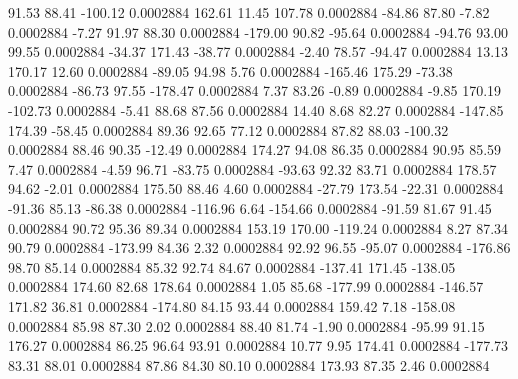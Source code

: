        91.53       88.41     -100.12     0.0002884
      162.61       11.45      107.78     0.0002884
      -84.86       87.80       -7.82     0.0002884
       -7.27       91.97       88.30     0.0002884
     -179.00       90.82      -95.64     0.0002884
      -94.76       93.00       99.55     0.0002884
      -34.37      171.43      -38.77     0.0002884
       -2.40       78.57      -94.47     0.0002884
       13.13      170.17       12.60     0.0002884
      -89.05       94.98        5.76     0.0002884
     -165.46      175.29      -73.38     0.0002884
      -86.73       97.55     -178.47     0.0002884
        7.37       83.26       -0.89     0.0002884
       -9.85      170.19     -102.73     0.0002884
       -5.41       88.68       87.56     0.0002884
       14.40        8.68       82.27     0.0002884
     -147.85      174.39      -58.45     0.0002884
       89.36       92.65       77.12     0.0002884
       87.82       88.03     -100.32     0.0002884
       88.46       90.35      -12.49     0.0002884
      174.27       94.08       86.35     0.0002884
       90.95       85.59        7.47     0.0002884
       -4.59       96.71      -83.75     0.0002884
      -93.63       92.32       83.71     0.0002884
      178.57       94.62       -2.01     0.0002884
      175.50       88.46        4.60     0.0002884
      -27.79      173.54      -22.31     0.0002884
      -91.36       85.13      -86.38     0.0002884
     -116.96        6.64     -154.66     0.0002884
      -91.59       81.67       91.45     0.0002884
       90.72       95.36       89.34     0.0002884
      153.19      170.00     -119.24     0.0002884
        8.27       87.34       90.79     0.0002884
     -173.99       84.36        2.32     0.0002884
       92.92       96.55      -95.07     0.0002884
     -176.86       98.70       85.14     0.0002884
       85.32       92.74       84.67     0.0002884
     -137.41      171.45     -138.05     0.0002884
      174.60       82.68      178.64     0.0002884
        1.05       85.68     -177.99     0.0002884
     -146.57      171.82       36.81     0.0002884
     -174.80       84.15       93.44     0.0002884
      159.42        7.18     -158.08     0.0002884
       85.98       87.30        2.02     0.0002884
       88.40       81.74       -1.90     0.0002884
      -95.99       91.15      176.27     0.0002884
       86.25       96.64       93.91     0.0002884
       10.77        9.95      174.41     0.0002884
     -177.73       83.31       88.01     0.0002884
       87.86       84.30       80.10     0.0002884
      173.93       87.35        2.46     0.0002884
